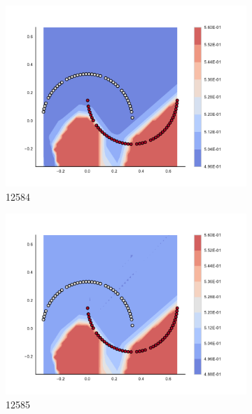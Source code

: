 \begin{figure}[h]
\begin{subfigure}[b]{0.09\textwidth}
    \includegraphics[clip, trim=2.35cm 1.75cm 4.5cm 0cm,width=\textwidth]{img/convergence/12584.pdf}
    \caption{12584}
    \label{fig:convergence_12584}
\end{subfigure}
%
\begin{subfigure}[b]{0.09\textwidth}
    \includegraphics[clip, trim=2.35cm 1.75cm 4.5cm 0cm,width=\textwidth]{img/convergence/12585.pdf}
    \caption{12585}
    \label{fig:convergence_12585}
\end{subfigure}
%
\begin{subfigure}[b]{0.09\textwidth}

\end{subfigure}
\end{figure}
